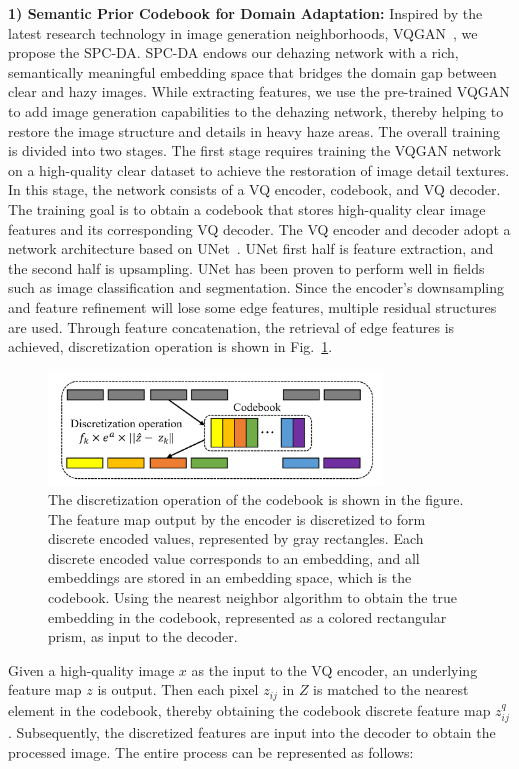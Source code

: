 \documentclass[journal]{IEEEtran}
\begin{document}
	{\bf{1) Semantic Prior Codebook for Domain Adaptation:}} Inspired by the latest research technology in image generation neighborhoods, VQGAN~\cite{esser2021taming}, we propose the SPC-DA. SPC-DA endows our dehazing network with a rich, semantically meaningful embedding space that bridges the domain gap between clear and hazy images. While extracting features, we use the pre-trained VQGAN to add image generation capabilities to the dehazing network, thereby helping to restore the image structure and details in heavy haze areas. The overall training is divided into two stages. The first stage requires training the VQGAN network on a high-quality clear dataset to achieve the restoration of image detail textures. In this stage, the network consists of a VQ encoder, codebook, and VQ decoder. The training goal is to obtain a codebook that stores high-quality clear image features and its corresponding VQ decoder. The VQ encoder and decoder adopt a network architecture based on UNet~\cite{ronneberger2015u}. UNet first half is feature extraction, and the second half is upsampling. UNet has been proven to perform well in fields such as image classification and segmentation. Since the encoder's downsampling and feature refinement will lose some edge features, multiple residual structures are used. Through feature concatenation, the retrieval of edge features is achieved, discretization operation is shown in Fig.~\ref{fig2}.

\begin{figure}[!t]
	\centering
	\includegraphics[width=3.49in]{images/discretization_operation}
	\caption{The discretization operation of the codebook is shown in the figure. The feature map output by the encoder is discretized to form discrete encoded values, represented by gray rectangles. Each discrete encoded value corresponds to an embedding, and all embeddings are stored in an embedding space, which is the codebook. Using the nearest neighbor algorithm to obtain the true embedding in the codebook, represented as a colored rectangular prism, as input to the decoder.}
	\label{fig2}
\end{figure}

Given a high-quality image $x$ as the input to the VQ encoder, an underlying feature map $z$ is output. Then each pixel $z_{ij}$ in $Z$ is matched to the nearest element in the codebook, thereby obtaining the codebook discrete feature map $z^{q}_{ij}$. Subsequently, the discretized features are input into the decoder to obtain the processed image. The entire process can be represented as follows:
\end{document}
